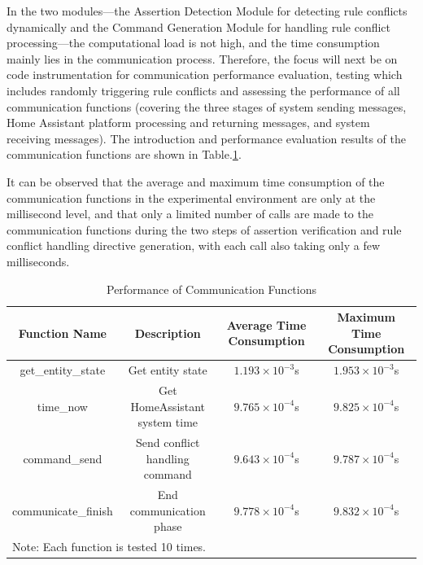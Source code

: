 In the two modules—the Assertion Detection Module for detecting rule conflicts dynamically and the Command Generation Module for handling rule conflict processing—the computational load is not high, and the time consumption mainly lies in the communication process. Therefore, the focus will next be on code instrumentation for communication performance evaluation, testing which includes randomly triggering rule conflicts and assessing the performance of all communication functions (covering the three stages of system sending messages, Home Assistant platform processing and returning messages, and system receiving messages). The introduction and performance evaluation results of the communication functions are shown in Table.\ref{performance_communication_function}.

It can be observed that the average and maximum time consumption of the communication functions in the experimental environment are only at the millisecond level, and that only a limited number of calls are made to the communication functions during the two steps of assertion verification and rule conflict handling directive generation, with each call also taking only a few milliseconds.

\begin{table}[htpb]
	\caption{Performance of Communication Functions}
	\label{performance_communication_function}
	\centering
	\begin{tabular}{c|c|c|c}
		\hline
		\textbf{Function Name} & \textbf{Description} & \textbf{Average Time Consumption} & \textbf{Maximum Time Consumption}\\
		\hline
		get\_entity\_state & Get entity state & $1.193 \times 10^{-3}$s & $1.953 \times 10^{-3}$s \\
		\hline
		time\_now & Get HomeAssistant system time & $9.765 \times 10^{-4}$s & $9.825 \times 10^{-4}$s \\
		\hline
		command\_send & Send conflict handling command & $9.643 \times 10^{-4}$s & $9.787 \times 10^{-4}$s \\
		\hline
		communicate\_finish & End communication phase & $9.778 \times 10^{-4}$s & $9.832 \times 10^{-4}$s \\
		\hline
		\multicolumn{4}{l}{Note: Each function is tested 10 times.} \\
	\end{tabular}
\end{table}